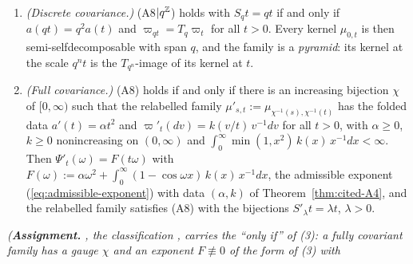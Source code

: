 \begin{theorem}
\begin{enumerate}
$\varpi_0 = 0$. Suppose that whenever $s < t$, $a(s) \le a(t)$, $\varpi_s \le \varpi_t$ setwise and
$(a(s), \varpi_s) \ne (a(t), \varpi_t)$, and that
$t \mapsto a(t)\omega^2 + \int(1 - \cos\omega v)\,\varpi_t(dv)$ is continuous for each $\omega$.
Then these are the folded data of the kernels of a family with (A1)--(A7) and (ND).
\item \emph{(Discrete covariance.)} (A8$|q^{\mathbb{Z}}$) holds with $S_qt = qt$ if and only if
$a(qt) = q^2a(t)$ and $\varpi_{qt} = T_q\varpi_t$ for all $t > 0$. Every kernel $\mu_{0,t}$ is
then semi-selfdecomposable with span $q$, and the family is a \emph{pyramid}: its kernel at the
scale $q^nt$ is the $T_{q^n}$-image of its kernel at $t$.
\item \emph{(Full covariance.)} (A8) holds if and only if there is an increasing bijection $\chi$
of $[0,\infty)$ such that the relabelled family $\mu'_{s,t} := \mu_{\chi^{-1}(s),\chi^{-1}(t)}$ has
the folded data $a'(t) = \alpha t^2$ and $\varpi'_t(dv) = k(v/t)\,v^{-1}dv$ for all $t > 0$, with
$\alpha \ge 0$, $k \ge 0$ nonincreasing on $(0,\infty)$ and
$\int_0^\infty\min(1, x^2)\,k(x)\,x^{-1}dx < \infty$. Then $\Psi'_t(\omega) = F(t\omega)$ with
$F(\omega) := \alpha\omega^2 + \int_0^\infty(1 - \cos\omega x)\,k(x)\,x^{-1}dx$, the admissible
exponent (\ref{eq:admissible-exponent}) with data $(\alpha, k)$ of Theorem~\ref{thm:cited-A4}, and the relabelled family satisfies
(A8) with the bijections $S'_\lambda t = \lambda t$, $\lambda > 0$.
\end{enumerate}
\statusA\quad{}\quad{}\quad\emph{(\textbf{Assignment.} , the
classification , carries the ``only if'' of (3): a fully
covariant family has a gauge $\chi$ and an exponent $F \not\equiv 0$ of the form of (3) with
}
\end{theorem}
